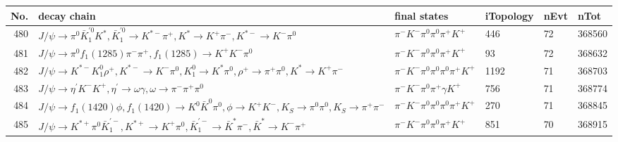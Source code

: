 \begin{table}[htbp] 
\begin{center}
\begin{small}
\begin{tabular}{rlllll}\hline\hline
 No. & decay chain & final states &  iTopology & nEvt & nTot \\\hline
480&$J/\psi       \rightarrow \pi^{0}        \bar{K}_1^{'0}K^{*}          , \bar{K}_1^{'0} \rightarrow K^{*-}         \pi^{+}        , K^{*}           \rightarrow K^{+}          \pi^{-}        , K^{*-}          \rightarrow K^{-}          \pi^{0}        $&$\pi^{-}        K^{-}          \pi^{0}        \pi^{0}        \pi^{+}        K^{+}          $&  446&   72&368560\\
481&$J/\psi       \rightarrow \pi^{0}        f_{1}(1285)    \pi^{-}        \pi^{+}        , f_{1}(1285)     \rightarrow K^{+}          K^{-}          \pi^{0}        $&$\pi^{-}        K^{-}          \pi^{0}        \pi^{0}        \pi^{+}        K^{+}          $&   93&   72&368632\\
482&$J/\psi       \rightarrow K^{*-}         K_1^{0}        \rho^{+}      , K^{*-}          \rightarrow K^{-}          \pi^{0}        , K_1^{0}         \rightarrow K^{*}          \pi^{0}        , \rho^{+}       \rightarrow \pi^{+}        \pi^{0}        , K^{*}           \rightarrow K^{+}          \pi^{-}        $&$\pi^{-}        K^{-}          \pi^{0}        \pi^{0}        \pi^{0}        \pi^{+}        K^{+}          $& 1192&   71&368703\\
483&$J/\psi       \rightarrow \eta^{\prime} K^{-}          K^{+}          , \eta^{\prime}  \rightarrow \omega         \gamma       , \omega          \rightarrow \pi^{-}        \pi^{+}        \pi^{0}        $&$\pi^{-}        K^{-}          \pi^{0}        \pi^{+}        \gamma       K^{+}          $&  756&   71&368774\\
484&$J/\psi       \rightarrow f_{1}(1420)    \phi           , f_{1}(1420)     \rightarrow K^{0}          \bar{K}^{0}   \pi^{0}        , \phi            \rightarrow K^{+}          K^{-}          , K_{S}           \rightarrow \pi^{0}        \pi^{0}        , K_{S}           \rightarrow \pi^{+}        \pi^{-}        $&$\pi^{-}        K^{-}          \pi^{0}        \pi^{0}        \pi^{0}        \pi^{+}        K^{+}          $&  270&   71&368845\\
485&$J/\psi       \rightarrow K^{*+}         \pi^{0}        \bar{K}_1^{'-}, K^{*+}          \rightarrow K^{+}          \pi^{0}        , \bar{K}_1^{'-} \rightarrow \bar{K}^{*}   \pi^{-}        , \bar{K}^{*}    \rightarrow K^{-}          \pi^{+}        $&$\pi^{-}        K^{-}          \pi^{0}        \pi^{0}        \pi^{+}        K^{+}          $&  851&   70&368915\\

\end{tabular}
\end{small}
\end{center}
\end{table}
